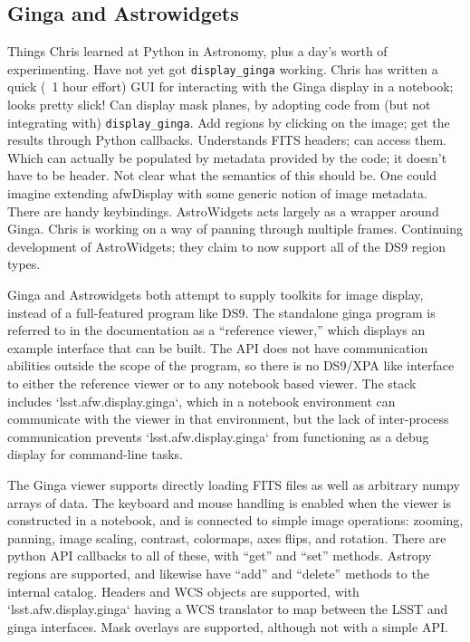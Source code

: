 \subsection{Ginga and Astrowidgets}
Things Chris learned at Python in Astronomy, plus a day's worth of experimenting.
Have not yet got \texttt{display\_ginga} working.
Chris has written a quick (~1 hour effort) GUI for interacting with the Ginga display in a notebook; looks pretty slick!
Can display mask planes, by adopting code from (but not integrating with) \texttt{display\_ginga}.
Add regions by clicking on the image; get the results through Python callbacks.
Understands FITS headers; can access them.
Which can actually be populated by metadata provided by the code; it doesn't have to be header.
Not clear what the semantics of this should be.
One could imagine extending afwDisplay with some generic notion of image metadata.
There are handy keybindings.
AstroWidgets acts largely as a wrapper around Ginga.
Chris is working on a way of panning through multiple frames.
Continuing development of AstroWidgets; they claim to now support all of the DS9 region types.

Ginga and Astrowidgets both attempt to supply toolkits for image display, instead of a full-featured program like DS9.  The standalone ginga program is referred to in the documentation as a ``reference viewer,'' which displays an example interface that can be built.  The API does not have communication abilities outside the scope of the program, so there is no DS9/XPA like interface to either the reference viewer or to any notebook based viewer.  The stack includes `lsst.afw.display.ginga`, which in a notebook environment can communicate with the viewer in that environment, but the lack of inter-process communication prevents `lsst.afw.display.ginga` from functioning as a debug display for command-line tasks.

The Ginga viewer supports directly loading FITS files as well as arbitrary numpy arrays of data.  The keyboard and mouse handling is enabled when the viewer is constructed in a notebook, and is connected to simple image operations: zooming, panning, image scaling, contrast, colormaps, axes flips, and rotation.  There are python API callbacks to all of these, with ``get'' and ``set'' methods.  Astropy regions are supported, and likewise have ``add'' and ``delete'' methods to the internal catalog.  Headers and WCS objects are supported, with `lsst.afw.display.ginga` having a WCS translator to map between the LSST and ginga interfaces.  Mask overlays are supported, although not with a simple API.


